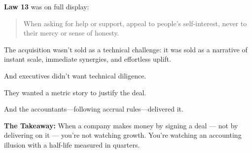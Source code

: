 \medskip

\textbf{Law 13} was on full display:

\begin{quote}
  When asking for help or support, appeal to people’s self-interest, never to their mercy or sense of honesty.
\end{quote}

The acquisition wasn’t sold as a technical challenge: it was sold as a narrative of instant scale, immediate synergies, and effortless uplift.  

And executives didn’t want technical diligence.  

They wanted a metric story to justify the deal.  

And the accountants—following accrual rules—delivered it.

\textbf{The Takeaway:}  
When a company makes money by signing a deal --- not by delivering on it --- you’re not watching growth.  
You’re watching an accounting illusion with a half-life measured in quarters.

